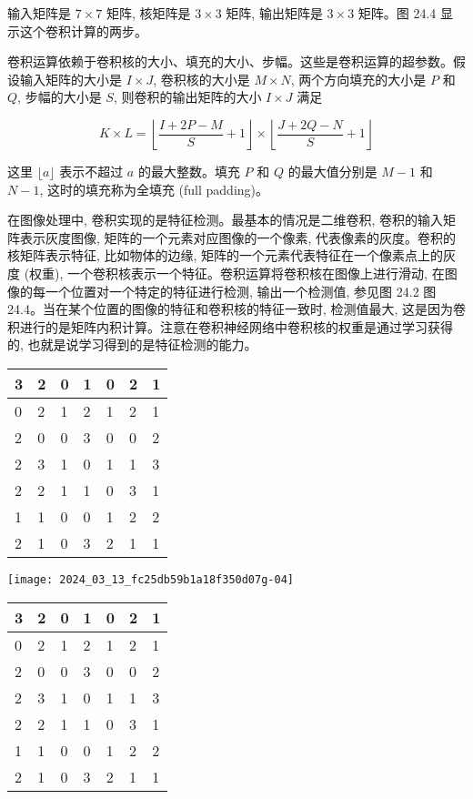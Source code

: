 \documentclass[10pt]{article}
\begin{document}
输入矩阵是 $7 \times 7$ 矩阵, 核矩阵是 $3 \times 3$ 矩阵, 输出矩阵是 $3 \times 3$ 矩阵。图 24.4 显示这个卷积计算的两步。

卷积运算依赖于卷积核的大小、填充的大小、步幅。这些是卷积运算的超参数。假设输入矩阵的大小是 $I \times J$, 卷积核的大小是 $M \times N$, 两个方向填充的大小是 $P$ 和 $Q$, 步幅的大小是 $S$, 则卷积的输出矩阵的大小 $I \times J$ 满足


\begin{equation*}
K \times L=\left\lfloor\frac{I+2 P-M}{S}+1\right\rfloor \times\left\lfloor\frac{J+2 Q-N}{S}+1\right\rfloor \tag{24.6}
\end{equation*}


这里 $\lfloor a\rfloor$ 表示不超过 $a$ 的最大整数。填充 $P$ 和 $Q$ 的最大值分别是 $M-1$ 和 $N-1$, 这时的填充称为全填充 (full padding)。

在图像处理中, 卷积实现的是特征检测。最基本的情况是二维卷积, 卷积的输入矩阵表示灰度图像, 矩阵的一个元素对应图像的一个像素, 代表像素的灰度。卷积的核矩阵表示特征, 比如物体的边缘, 矩阵的一个元素代表特征在一个像素点上的灰度 (权重), 一个卷积核表示一个特征。卷积运算将卷积核在图像上进行滑动, 在图像的每一个位置对一个特定的特征进行检测, 输出一个检测值, 参见图 24.2 图 24.4。当在某个位置的图像的特征和卷积核的特征一致时, 检测值最大, 这是因为卷积进行的是矩阵内积计算。注意在卷积神经网络中卷积核的权重是通过学习获得的, 也就是说学习得到的是特征检测的能力。

\begin{center}
\begin{tabular}{|l|l|l|l|l|l|l|}
\hline
3 & 2 & 0 & 1 & 0 & 2 & 1 \\
\hline
0 & 2 & 1 & 2 & 1 & 2 & 1 \\
\hline
2 & 0 & 0 & 3 & 0 & 0 & 2 \\
\hline
2 & 3 & 1 & 0 & 1 & 1 & 3 \\
\hline
2 & 2 & 1 & 1 & 0 & 3 & 1 \\
\hline
1 & 1 & 0 & 0 & 1 & 2 & 2 \\
\hline
2 & 1 & 0 & 3 & 2 & 1 & 1 \\
\hline
\end{tabular}
\end{center}

\begin{center}
\texttt{[image: 2024\_03\_13\_fc25db59b1a18f350d07g-04]}
\end{center}

\begin{center}
\begin{tabular}{|l|l|l|l|l|l|l|}
\hline
3 & 2 & 0 & 1 & 0 & 2 & 1 \\
\hline
0 & 2 & 1 & 2 & 1 & 2 & 1 \\
\hline
2 & 0 & 0 & 3 & 0 & 0 & 2 \\
\hline
2 & 3 & 1 & 0 & 1 & 1 & 3 \\
\hline
2 & 2 & 1 & 1 & 0 & 3 & 1 \\
\hline
1 & 1 & 0 & 0 & 1 & 2 & 2 \\
\hline
2 & 1 & 0 & 3 & 2 & 1 & 1 \\
\hline
\end{tabular}
\end{center}
\end{document}
